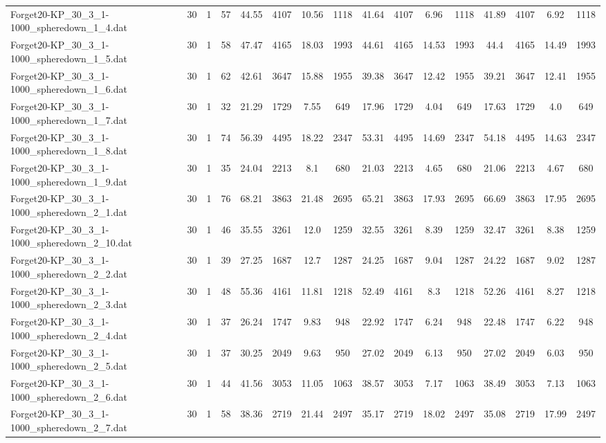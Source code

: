 \begin{sidewaystable}[!ht]
{\begin{tabular}{lccccccccccccccc}
Forget20-KP\_30\_3\_1-1000\_spheredown\_1\_4.dat & 30 & 1 & 57 & 44.55 & 4107 & 10.56 & 1118 & 41.64 & 4107 & 6.96 & 1118 & 41.89 & 4107 & 6.92 & 1118 \\
Forget20-KP\_30\_3\_1-1000\_spheredown\_1\_5.dat & 30 & 1 & 58 & 47.47 & 4165 & 18.03 & 1993 & 44.61 & 4165 & 14.53 & 1993 & 44.4 & 4165 & 14.49 & 1993 \\
Forget20-KP\_30\_3\_1-1000\_spheredown\_1\_6.dat & 30 & 1 & 62 & 42.61 & 3647 & 15.88 & 1955 & 39.38 & 3647 & 12.42 & 1955 & 39.21 & 3647 & 12.41 & 1955 \\
Forget20-KP\_30\_3\_1-1000\_spheredown\_1\_7.dat & 30 & 1 & 32 & 21.29 & 1729 & 7.55 & 649 & 17.96 & 1729 & 4.04 & 649 & 17.63 & 1729 & 4.0 & 649 \\
Forget20-KP\_30\_3\_1-1000\_spheredown\_1\_8.dat & 30 & 1 & 74 & 56.39 & 4495 & 18.22 & 2347 & 53.31 & 4495 & 14.69 & 2347 & 54.18 & 4495 & 14.63 & 2347 \\
Forget20-KP\_30\_3\_1-1000\_spheredown\_1\_9.dat & 30 & 1 & 35 & 24.04 & 2213 & 8.1 & 680 & 21.03 & 2213 & 4.65 & 680 & 21.06 & 2213 & 4.67 & 680 \\
Forget20-KP\_30\_3\_1-1000\_spheredown\_2\_1.dat & 30 & 1 & 76 & 68.21 & 3863 & 21.48 & 2695 & 65.21 & 3863 & 17.93 & 2695 & 66.69 & 3863 & 17.95 & 2695 \\
Forget20-KP\_30\_3\_1-1000\_spheredown\_2\_10.dat & 30 & 1 & 46 & 35.55 & 3261 & 12.0 & 1259 & 32.55 & 3261 & 8.39 & 1259 & 32.47 & 3261 & 8.38 & 1259 \\
Forget20-KP\_30\_3\_1-1000\_spheredown\_2\_2.dat & 30 & 1 & 39 & 27.25 & 1687 & 12.7 & 1287 & 24.25 & 1687 & 9.04 & 1287 & 24.22 & 1687 &  \textcolor{blue2}{9.02} & 1287 \\
Forget20-KP\_30\_3\_1-1000\_spheredown\_2\_3.dat & 30 & 1 & 48 & 55.36 & 4161 & 11.81 & 1218 & 52.49 & 4161 & 8.3 & 1218 & 52.26 & 4161 & 8.27 & 1218 \\
Forget20-KP\_30\_3\_1-1000\_spheredown\_2\_4.dat & 30 & 1 & 37 & 26.24 & 1747 & 9.83 & 948 & 22.92 & 1747 & 6.24 & 948 & 22.48 & 1747 &  \textcolor{blue2}{6.22} & 948 \\
Forget20-KP\_30\_3\_1-1000\_spheredown\_2\_5.dat & 30 & 1 & 37 & 30.25 & 2049 & 9.63 & 950 & 27.02 & 2049 & 6.13 & 950 & 27.02 & 2049 & 6.03 & 950 \\
Forget20-KP\_30\_3\_1-1000\_spheredown\_2\_6.dat & 30 & 1 & 44 & 41.56 & 3053 & 11.05 & 1063 & 38.57 & 3053 & 7.17 & 1063 & 38.49 & 3053 & 7.13 & 1063 \\
Forget20-KP\_30\_3\_1-1000\_spheredown\_2\_7.dat & 30 & 1 & 58 & 38.36 & 2719 & 21.44 & 2497 & 35.17 & 2719 & 18.02 & 2497 & 35.08 & 2719 & 17.99 & 2497 \\

\end{tabular}}
\end{sidewaystable}
